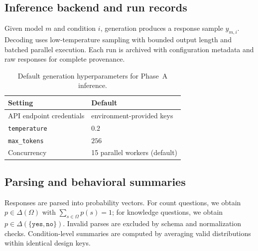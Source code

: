 \documentclass[11pt]{article}
\begin{document}
\subsection{Inference backend and run records}

Given model $m$ and condition $i$, generation produces a response sample $y_{m,i}$. Decoding uses low-temperature sampling with bounded output length and batched parallel execution. Each run is archived with configuration metadata and raw responses for complete provenance.

\begin{table}[t]

  \centering

  \footnotesize

  \setlength{\tabcolsep}{3pt}

  \renewcommand{\arraystretch}{0.92}

  \begin{tabularx}{\linewidth}{@{}lX@{}}

    \toprule

    \textbf{Setting} & \textbf{Default} \\

    \midrule

    API endpoint credentials & environment-provided keys \\

    \texttt{temperature} & $0.2$ \\

    \texttt{max\_tokens} & $256$ \\

    Concurrency & 15 parallel workers (default) \\

    \bottomrule

  \end{tabularx}

  \caption{Default generation hyperparameters for Phase~A inference.}

  \label{tab:inference_defaults}

\end{table}



\subsection{Parsing and behavioral summaries}

Responses are parsed into probability vectors. For count questions, we obtain $p\in\Delta(\Omega)$ with $\sum_{s\in\Omega}p(s)=1$; for knowledge questions, we obtain $p\in\Delta(\{\texttt{yes},\texttt{no}\})$. Invalid parses are excluded by schema and normalization checks. Condition-level summaries are computed by averaging valid distributions within identical design keys.
\end{document}
